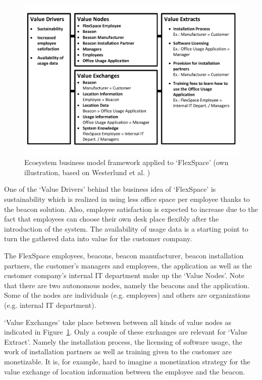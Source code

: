 		\begin{figure}[ht]
		    \begin{center}
		    \includegraphics[scale=0.55]{Talk11/use_case_westerlund.pdf}
		    \end{center}
		    \caption{Ecosystem business model framework applied to `FlexSpace' (own illustration, based on Westerlund et al. \cite{westerlund})}
		    \label{fig:use_case_westerlund}
		\end{figure}

		One of the `Value Drivers' behind the business idea of `FlexSpace' is sustainability which is realized in using less office space per employee thanks to the beacon solution. Also, employee satisfaction is expected to increase due to the fact that employees can choose their own desk place flexibly after the introduction of the system. The availability of usage data is a starting point to turn the gathered data into value for the customer company. 

		The FlexSpace employees, beacons, beacon manufacturer, beacon installation partners, the customer's managers and employees, the application as well as the customer company's internal IT department make up the `Value Nodes'. Note that there are two autonomous nodes, namely the beacons and the application. Some of the nodes are individuals (e.g. employees) and others are organizations (e.g. internal IT department).

		`Value Exchanges' take place between between all kinds of value nodes as indicated in Figure~\ref{fig:use_case_westerlund}. Only a couple of these exchanges are relevant for `Value Extract'. Namely the installation process, the licensing of software usage, the work of installation partners as well as training given to the customer are monetizable. It is, for example, hard to imagine a monetization strategy for the value exchange of location information between the employee and the beacon.

